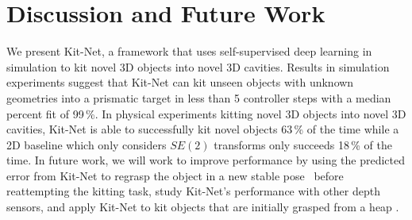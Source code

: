 \section{Discussion and Future Work}
\label{sec:discussion}
We present Kit-Net, a framework that uses self-supervised deep learning in simulation to kit novel 3D objects into novel 3D cavities. Results in simulation experiments suggest that Kit-Net can kit unseen objects with unknown geometries into a prismatic target in less than 5 controller steps with a median percent fit of 99\,\%.
In physical experiments kitting novel 3D objects into novel 3D cavities, Kit-Net is able to successfully kit novel objects 63\,\% of the time while a 2D baseline which only considers $SE(2)$ transforms only succeeds 18\,\% of the time.
In future work, we will work to improve performance by using the predicted error from Kit-Net
to regrasp the object in a new stable pose~\cite{tournassoud1987regrasping,dafle2014extrinsic,danielczuk2020exploratory} before reattempting the kitting task, study Kit-Net's performance with other depth sensors, and apply Kit-Net to kit objects that are initially grasped from a heap \cite{murali20206,danielczuk2020x}.
